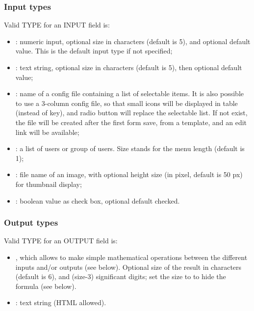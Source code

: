 \subsubsection{Input types}

Valid TYPE for an INPUT field is:
\begin{itemize}
	\item {}: numeric input, optional size in characters (default is 5), and optional default value. This is the default input type if not specified;
	\item {} : text string, optional size in characters (default is 5), then optional default value;
	\item {}: name of a config file containing a  list of selectable items. It is also possible to use a  3-column config file, so that small icons will be displayed in table (instead of key), and radio button will replace the selectable list. If not exist, the file will be created after the first form save, from a template, and an edit link will be available;
	\item {}: a list of users or group of users. Size stands for the menu length (default is 1);
	\item {}: file name of an image, with optional height size (in pixel, default is 50 px) for thumbnail display;
	\item {}: boolean value as check box, optional default checked.
\end{itemize}

\subsubsection{Output types}

Valid TYPE for an OUTPUT field is:
\begin{itemize}
	\item {}, which allows to make simple mathematical operations between the different inputs and/or outputs (see below). Optional size of the result in characters (default is 6), and (size-3) significant digits; set the size to  to hide the formula (see below).
	\item {} : text string (HTML allowed).
\end{itemize}

